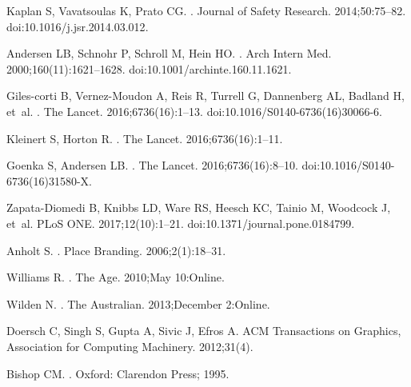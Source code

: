 Kaplan S, Vavatsoulas K, Prato CG.
.
\newblock Journal of Safety Research. 2014;50:75--82.
\newblock doi:{10.1016/j.jsr.2014.03.012}.

Andersen LB, Schnohr P, Schroll M, Hein HO.
.
\newblock Arch Intern Med. 2000;160(11):1621--1628.
\newblock doi:{10.1001/archinte.160.11.1621}.

Giles-corti B, Vernez-Moudon A, Reis R, Turrell G, Dannenberg AL, Badland H,
  et~al.
.
\newblock The Lancet. 2016;6736(16):1--13.
\newblock doi:{10.1016/S0140-6736(16)30066-6}.

Kleinert S, Horton R.
.
\newblock The Lancet. 2016;6736(16):1--11.

Goenka S, Andersen LB.
.
\newblock The Lancet. 2016;6736(16):8--10.
\newblock doi:{10.1016/S0140-6736(16)31580-X}.

Zapata-Diomedi B, Knibbs LD, Ware RS, Heesch KC, Tainio M, Woodcock J, et~al.
\newblock PLoS ONE. 2017;12(10):1--21.
\newblock doi:{10.1371/journal.pone.0184799}.

Anholt S.
.
\newblock Place Branding. 2006;2(1):18--31.

Williams R.
.
\newblock The Age. 2010;May 10:Online.

Wilden N.
.
\newblock The Australian. 2013;December 2:Online.

Doersch C, Singh S, Gupta A, Sivic J, Efros A.
\newblock ACM Transactions on Graphics, Association for Computing Machinery.
  2012;31(4).

Bishop CM.
.
\newblock Oxford: Clarendon Press; 1995.


